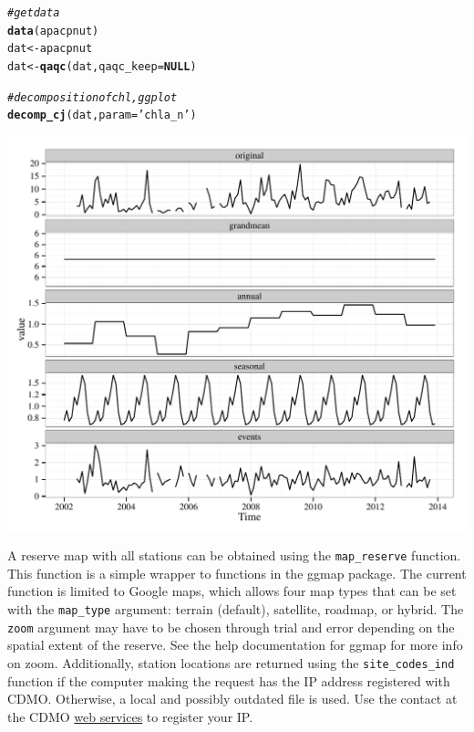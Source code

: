 \documentclass[10pt,letterpaper]{article}\usepackage[]{graphicx}\usepackage[]{color}
\makeatletter
\def\maxwidth{ %
  \ifdim\Gin@nat@width>\linewidth
    \linewidth
  \else
    \Gin@nat@width
  \fi
}
\newcommand{\hlstr}[1]{\textcolor[rgb]{0.192,0.494,0.8}{#1}}%
\newcommand{\hlcom}[1]{\textcolor[rgb]{0.678,0.584,0.686}{\textit{#1}}}%
\newcommand{\hlstd}[1]{\textcolor[rgb]{0.345,0.345,0.345}{#1}}%
\newcommand{\hlkwa}[1]{\textcolor[rgb]{0.161,0.373,0.58}{\textbf{#1}}}%
\newcommand{\hlkwb}[1]{\textcolor[rgb]{0.69,0.353,0.396}{#1}}%
\newcommand{\hlkwc}[1]{\textcolor[rgb]{0.333,0.667,0.333}{#1}}%
\newcommand{\hlkwd}[1]{\textcolor[rgb]{0.737,0.353,0.396}{\textbf{#1}}}%
\newenvironment{kframe}{%
 \def\at@end@of@kframe{}%
 \ifinner\ifhmode%
  \def\at@end@of@kframe{\end{minipage}}%
  \begin{minipage}{\columnwidth}%
 \fi\fi%
 \def\FrameCommand##1{\hskip\@totalleftmargin \hskip-\fboxsep
 \colorbox{shadecolor}{##1}\hskip-\fboxsep
     \hskip-\linewidth \hskip-\@totalleftmargin \hskip\columnwidth}%
 \MakeFramed {\advance\hsize-\width
   \@totalleftmargin\z@ \linewidth\hsize
   \@setminipage}}%
 {\par\unskip\endMakeFramed%
 \at@end@of@kframe}
\newenvironment{knitrout}{}{} %
\makeatother
\begin{document}
\begin{knitrout}
\color{fgcolor}\begin{kframe}
\begin{alltt}
\hlcom{# get data}
\hlkwd{data}\hlstd{(apacpnut)}
\hlstd{dat} \hlkwb{<-} \hlstd{apacpnut}
\hlstd{dat} \hlkwb{<-} \hlkwd{qaqc}\hlstd{(dat,} \hlkwc{qaqc_keep} \hlstd{=} \hlkwa{NULL}\hlstd{)}

\hlcom{# decomposition of chl, ggplot}
\hlkwd{decomp_cj}\hlstd{(dat,} \hlkwc{param} \hlstd{=} \hlstr{'chla_n'}\hlstd{)}
\end{alltt}
\end{kframe}

{\centering \includegraphics[width=\maxwidth]{figure/unnamed-chunk-18} 

}



\end{knitrout}

A reserve map with all stations can be obtained using the \texttt{map\_reserve} function.  This function is a simple wrapper to functions in the ggmap package. The current function is limited to Google maps, which allows four map types that can be set with the \texttt{map\_type} argument: terrain (default), satellite, roadmap, or hybrid.  The \texttt{zoom} argument may have to be chosen through trial and error depending on the spatial extent of the reserve.  See the help documentation for ggmap for more info on zoom.  Additionally, station locations are returned using the \texttt{site\_codes\_ind} function if the computer making the request has the IP address registered with \ac{CDMO}. Otherwise, a local and possibly outdated file is used.  Use the contact at the \ac{CDMO} \href{http://cdmo.baruch.sc.edu/webservices.cfm}{web services} to register your IP.
\end{document}
